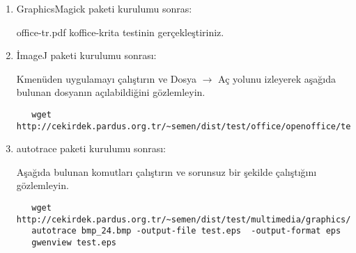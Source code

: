 \documentclass[a4paper,10pt]{article}
\begin{document}
\begin{enumerate}
\begin{verbatim}
export LC_ALL=<lang_LANG>
\end{verbatim}

lang\_LANG şeklinde yazılmış olan, pt-BT için pt\_BT, diğer diller için örneğin de\_DE olacaktır.

Daha sonra bu çalıştırdığınız komut dizininde gimp komutunu çalıştırın, uygulamanın sorunsuz bir şekilde istenilen dilde açıldığını gözlemleyin.
\begin{verbatim}
gimp-i18n-es
gimp-i18n-sk
gimp-i18n-sl
gimp-i18n-sr
gimp-i18n-sr_Latn
gimp-i18n-sv
gimp-i18n-ta
gimp-i18n-th
gimp-i18n-tt
gimp-i18n-uk
gimp-i18n-vi
gimp-i18n-et
gimp-i18n-eu
gimp-i18n-fa
gimp-i18n-fi
gimp-i18n-fr
gimp-i18n-ga
gimp-i18n-gl
gimp-i18n-gu
gimp-i18n-he
gimp-i18n-hi
gimp-i18n-xh
gimp-i18n-yi
gimp-i18n-zh_CN
gimp-i18n-zh_HK
gimp-i18n-zh_TW
gimp-i18n-hr
gimp-i18n-hu
gimp-i18n-id
gimp-i18n-is
gimp-i18n-it
gimp-i18n-ja
gimp-i18n-ka
gimp-i18n-km
gimp-i18n-kn
gimp-i18n-ko
gimp-i18n-lt
gimp-i18n-lv
gimp-i18n-mk
gimp-i18n-ml
gimp-i18n-mr
gimp-i18n-ms
gimp-i18n-nb
gimp-i18n-ne
gimp-i18n-nl
gimp-i18n-nn
gimp-i18n-oc
gimp-i18n-or
gimp-i18n-pa
gimp-i18n-pl
gimp-i18n-pt
gimp-i18n-pt_BR
gimp-i18n-ro
gimp-i18n-ru
gimp-i18n-rw
gimp-i18n-si 
\end{verbatim}

 \item GraphicsMagick  paketi kurulumu sonras:

office-tr.pdf koffice-krita testinin gerçekleştiriniz.

 \item İmageJ paketi kurulumu sonrası:

 Kmenüden uygulamayı çalıştırın ve Dosya $\rightarrow$ Aç yolunu izleyerek aşağıda bulunan dosyanın açılabildiğini gözlemleyin.
  \begin{verbatim}
   wget http://cekirdek.pardus.org.tr/~semen/dist/test/office/openoffice/test_oodraw.jpg
  \end{verbatim}

\item autotrace paketi kurulumu sonrası:

Aşağıda bulunan komutları çalıştırın ve sorunsuz bir şekilde çalıştığını gözlemleyin.
  \begin{verbatim}
   wget http://cekirdek.pardus.org.tr/~semen/dist/test/multimedia/graphics/bmp_24.bmp
   autotrace bmp_24.bmp -output-file test.eps  -output-format eps
   gwenview test.eps 
  \end{verbatim}


\end{enumerate}
\end{document}
